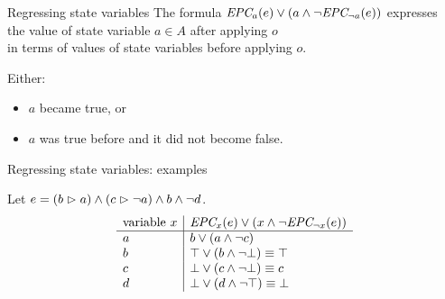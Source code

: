 \documentclass{gkibeamer}
\begin{document}
\begin{frame}{Regressing state variables}
  The formula
  $\textit{EPC}_{a}(e) \lor (a \land \neg \textit{EPC}_{\neg a}(e))$
  expresses \\
  the \alert{value of state variable $a \in A$ after applying $o$} \\
  in terms of \alert{values of state variables before applying $o$}.
  
  \bigskip
    
  Either:
  \begin{itemize}
  \item $a$ became true, or
  \item $a$ was true before and it did not become false.
  \end{itemize}
\end{frame}

\begin{frame}{Regressing state variables: examples}
  \begin{example}
    Let $e = (b \vartriangleright a) \land (c \vartriangleright \neg a) \land b \land \neg d$.
    \[
      \begin{array}{l|l}
        \text{variable~} x
        & \textit{EPC}_{x}(e) \lor (x \land
        \neg \textit{EPC}_{\neg x}(e)) \\ \hline
        a & b \lor (a \land \neg c) \\
        b & \top \lor(b \land \neg \bot) \equiv \top \\
        c & \bot \lor(c \land \neg \bot) \equiv c \\
        d & \bot \lor(d \land \neg \top) \equiv \bot
      \end{array}
    \]
  \end{example}
\end{frame}
\end{document}
